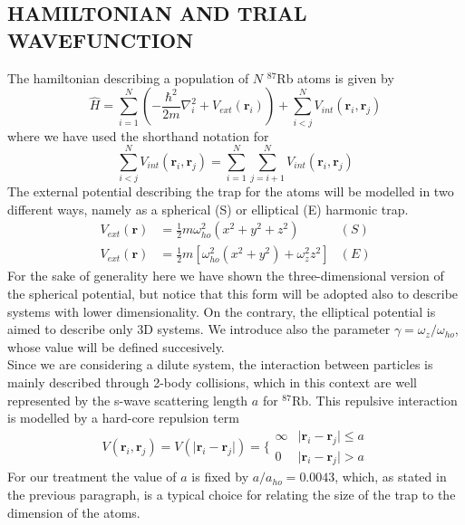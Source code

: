 \subsection{HAMILTONIAN AND TRIAL WAVEFUNCTION} \label{sec:hamiltonian_and_wfunction}
The hamiltonian describing a population of $N$ $^{87}$Rb atoms is given by
\begin{equation}
    \hat{H} = \sum_{i=1}^N \left(-\frac{\hbar^2}{2m}{\nabla}_{i}^2 +V_{ext}({\mathbf{r}}_i)\right)  + \sum_{i<j}^{N} V_{int}({\mathbf{r}}_i,{\mathbf{r}}_j)
    \label{hamiltonian}
\end{equation}
where we have used the shorthand notation for
\begin{equation*}
    \sum_{i<j}^N V_{int}({\mathbf{r}}_i,{\mathbf{r}}_j)  = \sum_{i=1}^N \sum_{j=i+1}^N V_{int}({\mathbf{r}}_i,{\mathbf{r}}_j)
\end{equation*}
The external potential describing the trap for the atoms will be modelled in two different ways, namely as a spherical (S) or elliptical (E) harmonic trap. 
\begin{align}
    V_{ext}(\mathbf{r}) &= \frac{1}{2}m\omega_{ho}^2(x^2 + y^2 + z^2) & (S)  \label{spherical_pot} \\
    V_{ext}(\mathbf{r}) &= \frac{1}{2}m[\omega_{ho}^2(x^2+y^2) + \omega_z^2z^2] & (E) \label{elliptical_pot}
\end{align}
For the sake of generality here we have shown the three-dimensional version of the spherical potential, but notice that this form will be adopted also to describe systems with lower dimensionality. On the contrary, the elliptical potential is aimed to describe only 3D systems. We introduce also the parameter $\gamma= \omega_z / \omega_{ho}$, whose value will be defined succesively.\\

Since we are considering a dilute system, the interaction between particles is mainly described through 2-body collisions, which in this context are well represented by the s-wave scattering length $a$ for $^{87}$Rb. This repulsive interaction is modelled by a hard-core repulsion term
\begin{equation*}
    V(\bm{r}_i, \bm{r}_j) = V(\vert \bm{r}_i - \bm{r}_j \vert ) = \Bigg\{
    \begin{array}{ll}
        \infty &  \vert \bm{r}_i - \bm{r}_j \vert \leq a \\
        0 & \vert \bm{r}_i - \bm{r}_j \vert > a 
    \end{array}
\end{equation*}
For our treatment the value of $a$ is fixed by $a/a_{ho} = 0.0043$, which, as stated in the previous paragraph, is a typical choice for relating the size of the trap to the dimension of the atoms. \\

